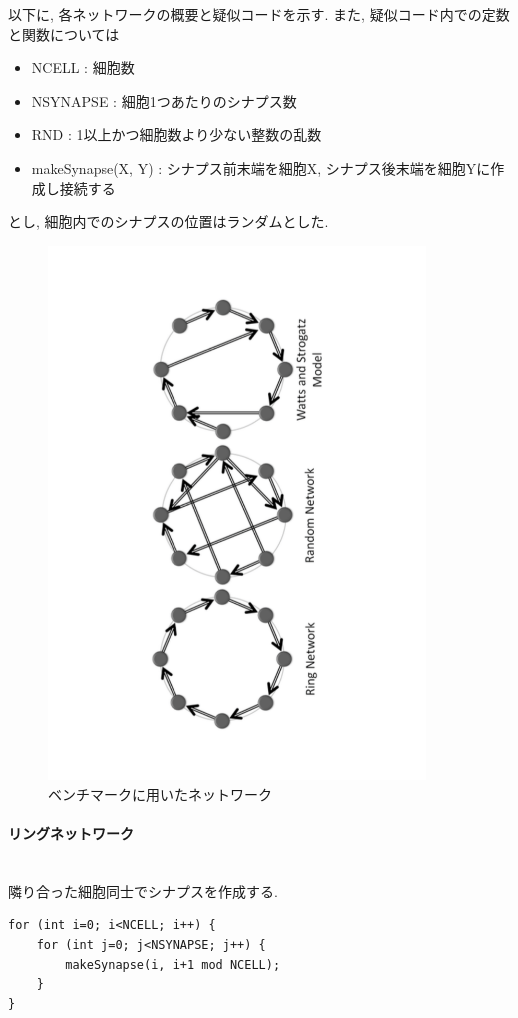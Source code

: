 以下に, 各ネットワークの概要と疑似コードを示す. また, 疑似コード内での定数と関数については
\begin{itemize}
\item NCELL : 細胞数
\item NSYNAPSE : 細胞1つあたりのシナプス数
\item RND : 1以上かつ細胞数より少ない整数の乱数
\item makeSynapse(X, Y) : シナプス前末端を細胞X, シナプス後末端を細胞Yに作成し接続する
\end{itemize}
とし, 細胞内でのシナプスの位置はランダムとした.\\

\begin{figure}[htb]
 \begin{center}
    \includegraphics[width=10cm, angle=-90]{./images/bench.pdf}
    \caption{ベンチマークに用いたネットワーク}
    \label{fig:bench-network}
 \end{center}
\end{figure}

\paragraph{リングネットワーク}~\\
隣り合った細胞同士でシナプスを作成する.
{\footnotesize
\begin{lstlisting}[numbers=none, caption=リングネットワークの作成]
for (int i=0; i<NCELL; i++) {
    for (int j=0; j<NSYNAPSE; j++) {
        makeSynapse(i, i+1 mod NCELL);
    }
}
\end{lstlisting}
}
